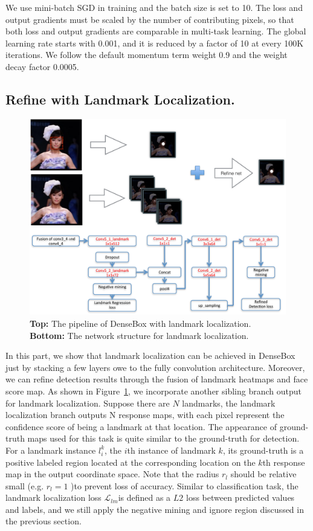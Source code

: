 We use mini-batch SGD in training and the batch size is set to 10. The loss and output gradients must be scaled by the number of contributing pixels, so that both loss and output gradients are comparable in multi-task learning. The global learning rate starts with 0.001, and it is reduced by a factor of 10 at every 100K iterations. We follow the default momentum term weight 0.9 and the weight decay factor 0.0005. 


\subsection{Refine with Landmark Localization.} 
	\begin{figure}[!hbtp]
	\centering
	 \includegraphics[scale=0.45]{figures/figure4-crop.pdf}
	\caption{\textbf{Top: } The pipeline of DenseBox with landmark localization. \textbf{Bottom: } The network structure for landmark localization. }
	\label{fig:fig_refine}
	\end{figure}
In this part, we show that landmark localization can be achieved in DenseBox just by stacking a few layers owe to the fully convolution architecture. Moreover, we can refine detection results through the fusion of landmark heatmaps and face score map. As shown in Figure~\ref{fig:fig_refine},  we incorporate another sibling branch output for landmark localization. Suppose there are $N$ landmarks, the landmark localization branch outputs N response maps, with each pixel represent the confidence score of being a landmark at that location.  The appearance of ground-truth maps used for this task is quite similar to the ground-truth for detection.  For a landmark instance $l^k_i$, the $i$th instance of landmark $k$, its ground-truth is a positive labeled region located at the corresponding location on the $k$th response map in the output coordinate space.  Note that the radius $r_l$ should be relative small (e.g. $r_l = 1$  )to prevent loss of accuracy.   Similar to classification task, the landmark localization loss $\mathcal{L} _{lm}$is defined as a $L2$ loss between predicted values and labels, and we still apply the negative mining and ignore region discussed in the previous section. 

